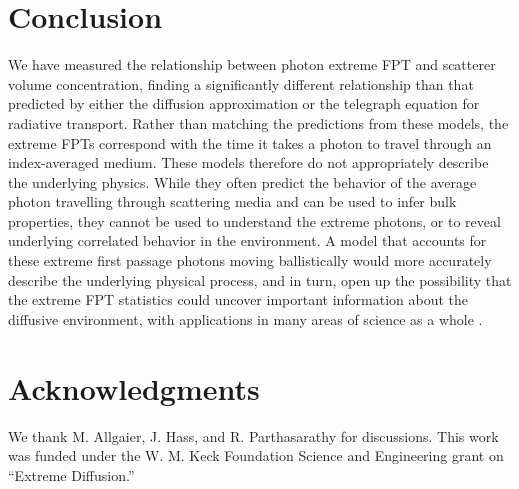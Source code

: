 \documentclass[floatfix,aps,prl,reprint,groupedaddress]{revtex4-2}
\begin{document}
\section{Conclusion}
We have measured the relationship between photon extreme FPT and scatterer volume concentration, finding a significantly different relationship than that predicted by either the diffusion approximation or the telegraph equation for radiative transport. Rather than matching the predictions from these models, the extreme FPTs correspond with the time it takes a photon to travel through an index-averaged medium. These models therefore do not appropriately describe the underlying physics. While they often predict the behavior of the average photon travelling through scattering media and can be used to infer bulk properties, they cannot be used to understand the extreme photons, or to reveal underlying correlated behavior in the environment. A model that accounts for these extreme first passage photons moving ballistically would more accurately describe the underlying physical process, and in turn, open up the possibility that the extreme FPT statistics could uncover important information about the diffusive environment, with applications in many areas of science as a whole \cite{allgaier_diffuse_2021, collis_lidar_1966, loumaigne_intrinsic_2015, aleandri_dynamic_2018, taitelbaum_diagnosis_1999,das_non-fickian_1998,weiss_applications_2002,dudko_photon_2005}.

\section{Acknowledgments}
We thank M. Allgaier, J. Hass, and R. Parthasarathy for discussions. This work was funded under the W. M. Keck Foundation Science and Engineering grant on “Extreme Diffusion.”


\end{document}
